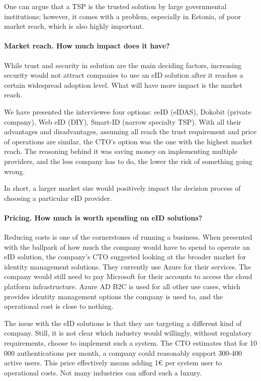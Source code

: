 One can argue that a TSP is the trusted solution by large governmental institutions; however, it comes with a problem, especially in Estonia, of poor market reach, which is also highly important.

\paragraph{Market reach. How much impact does it have?}

While trust and security in solution are the main deciding factors, increasing security would not attract companies to use an eID solution after it reaches a certain widespread adoption level. What will have more impact is the market reach.

We have presented the interviewee four options: eeID (eIDAS), Dokobit (private company), Web eID (DIY), Smart-ID (narrow specialty TSP). With all their advantages and disadvantages, assuming all reach the trust requirement and price of operations are similar, the CTO's option was the one with the highest market reach. The reasoning behind it was saving money on implementing multiple providers, and the less company has to do, the lower the risk of something going wrong.

In short, a larger market size would positively impact the decision process of choosing a particular eID provider.

\paragraph{Pricing. How much is worth spending on eID solutions?}

Reducing costs is one of the cornerstones of running a business. When presented with the ballpark of how much the company would have to spend to operate an eID solution, the company's CTO suggested looking at the broader market for identity management solutions. They currently use Azure for their services. The company would still need to pay Microsoft for their accounts to access the cloud platform infrastructure. Azure AD B2C is used for all other use cases, which provides identity management options the company is used to, and the operational cost is close to nothing.

The issue with the eID solutions is that they are targeting a different kind of company. Still, it is not clear which industry would willingly, without regulatory requirements, choose to implement such a system. The CTO estimates that for 10 000 authentications per month, a company could reasonably support 300-400 active users. This price effectively means adding 1€ per system user to operational costs. Not many industries can afford such a luxury.

